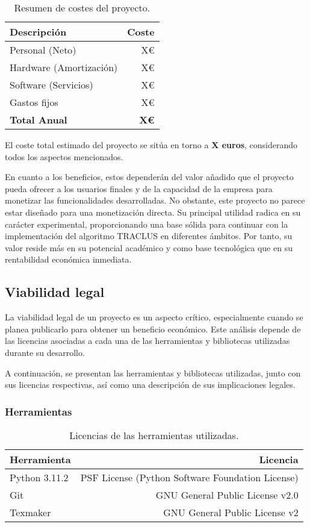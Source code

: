 \begin{table}[H]
\centering
\begin{tabular}{lr}
\toprule
Descripción & Coste \\ 
\midrule
Personal (Neto) & X€ \\ 
Hardware (Amortización) & X€ \\ 
Software (Servicios) & X€ \\ 
Gastos fijos & X€ \\ 
\textbf{Total Anual} & \textbf{X€} \\ 
\bottomrule
\end{tabular}
\caption{Resumen de costes del proyecto.}
\end{table}

El coste total estimado del proyecto se sitúa en torno a \textbf{X euros}, considerando todos los aspectos mencionados.

En cuanto a los beneficios, estos dependerán del valor añadido que el proyecto pueda ofrecer a los usuarios finales y de la capacidad de la empresa para monetizar las funcionalidades desarrolladas. No obstante, este proyecto no parece estar diseñado para una monetización directa. Su principal utilidad radica en su carácter experimental, proporcionando una base sólida para continuar con la implementación del algoritmo TRACLUS en diferentes ámbitos. Por tanto, su valor reside más en su potencial académico y como base tecnológica que en su rentabilidad económica inmediata.

\subsection{Viabilidad legal}

La viabilidad legal de un proyecto es un aspecto crítico, especialmente cuando se planea publicarlo para obtener un beneficio económico. Este análisis depende de las licencias asociadas a cada una de las herramientas y bibliotecas utilizadas durante su desarrollo.

A continuación, se presentan las herramientas y bibliotecas utilizadas, junto con sus licencias respectivas, así como una descripción de sus implicaciones legales.

\subsubsection{Herramientas}

\begin{table}[H]
\centering
\begin{tabular}{lr}
\toprule
Herramienta & Licencia \\ 
\midrule
Python 3.11.2 & PSF License (Python Software Foundation License) \\ 
Git & GNU General Public License v2.0 \\ 
Texmaker & GNU General Public License v2 \\ 
\bottomrule
\end{tabular}
\caption{Licencias de las herramientas utilizadas.}
\end{table}

